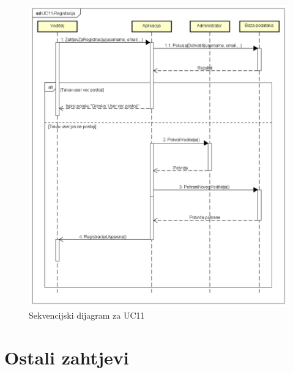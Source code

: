 \begin{packed_item}
				\begin{figure}[H]
					\includegraphics[width=\textwidth]{slike/Registracija.png} %
					\caption{Sekvencijski dijagram za UC11}
					\label{fig:Registracija}
				\end{figure}
				\eject	
				
		\section{Ostali zahtjevi}
		

\end{packed_item}
